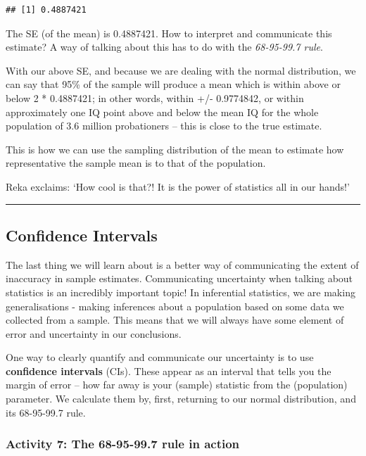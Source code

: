 \documentclass[
]{book}
\begin{document}
\begin{verbatim}
## [1] 0.4887421
\end{verbatim}

The SE (of the mean) is 0.4887421. How to interpret and communicate this estimate? A way of talking about this has to do with the \emph{68-95-99.7 rule}.

With our above SE, and because we are dealing with the normal distribution, we can say that 95\% of the sample will produce a mean which is within above or below 2 * 0.4887421; in other words, within +/- 0.9774842, or within approximately one IQ point above and below the mean IQ for the whole population of 3.6 million probationers -- this is close to the true estimate.

This is how we can use the sampling distribution of the mean to estimate how representative the sample mean is to that of the population.

Reka exclaims: `How cool is that?! It is the power of statistics all in our hands!'

\begin{center}\rule{0.5\linewidth}{0.5pt}\end{center}

\hypertarget{confidence-intervals}{%
\subsection{Confidence Intervals}\label{confidence-intervals}}

The last thing we will learn about is a better way of communicating the extent of inaccuracy in sample estimates. Communicating uncertainty when talking about statistics is an incredibly important topic! In inferential statistics, we are making generalisations - making inferences about a population based on some data we collected from a sample. This means that we will always have some element of error and uncertainty in our conclusions.

One way to clearly quantify and communicate our uncertainty is to use \textbf{confidence intervals} (CIs). These appear as an interval that tells you the margin of error -- how far away is your (sample) statistic from the (population) parameter. We calculate them by, first, returning to our normal distribution, and its 68-95-99.7 rule.

\hypertarget{activity-7-the-68-95-99.7-rule-in-action}{%
\subsubsection{Activity 7: The 68-95-99.7 rule in action}\label{activity-7-the-68-95-99.7-rule-in-action}}
\end{document}
